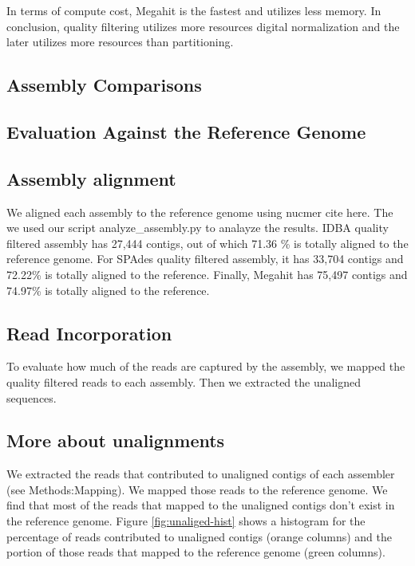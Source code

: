 In terms of compute cost, Megahit is the fastest and utilizes less memory. 
In conclusion, quality filtering utilizes more resources digital normalization and the later utilizes more resources than partitioning.


\subsection*{Assembly Comparisons} 


\subsection*{Evaluation Against the Reference Genome} 


\subsection*{Assembly alignment} 
We aligned each assembly to the reference genome using nucmer {cite here}. The we used our script {analyze\_assembly.py} to analayze the results. 
IDBA quality filtered assembly has 27,444 contigs,  out of which 71.36 \% is totally aligned to the reference genome. For SPAdes quality filtered assembly, it has 33,704 contigs  and 72.22\% is totally aligned to the reference. Finally,  Megahit has 75,497 contigs and 74.97\% is totally aligned to the reference.

\subsection*{Read Incorporation}
To evaluate how much of the reads are captured by the assembly, we mapped the quality filtered reads to each assembly.  Then we extracted the unaligned sequences. 



\subsection*{More about unalignments}

We extracted the reads that contributed to unaligned contigs of each assembler (see Methods:Mapping). We mapped those reads to the reference genome. We find that most of the reads that mapped to the unaligned contigs don't exist in the reference genome.  Figure \ref{fig:unaliged-hist} shows a histogram for the percentage of reads contributed to unaligned contigs (orange columns) and the portion of those reads that mapped to the reference genome (green columns). 


